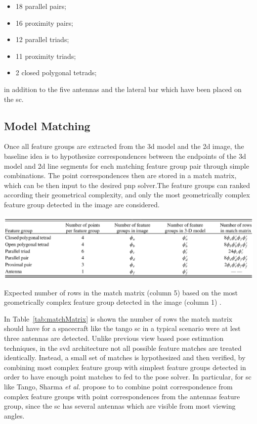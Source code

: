 \begin{itemize}
  \item 18 parallel pairs;
  \item 16 proximity pairs;
  \item 12 parallel triads;
  \item 11 proximity triads;
  \item 2 closed polygonal tetrads;
\end{itemize}

in addition to the five antennas and the lateral bar which have been placed on the \acrshort{sc}.

\subsection{Model Matching}
Once all feature groups are extracted from the \acrshort{3d} model and the \acrshort{2d} image, the baseline idea is to hypothesize correspondences between the endpoints of the \acrshort{3d} model and \acrshort{2d} line segments for each matching feature group pair through simple combinations. The point correspondences then are stored in a match matrix, which can be then input to the desired \acrshort{pnp} solver.The feature groups can ranked according their geometrical complexity, and only the most geometrically complex feature group detected in the image are considered.

\begin{table}[htbp]
  \centering
  \includegraphics[width=1.0\textwidth]{gfx/matchMatrix.eps}
  \caption{Expected number of rows in the match matrix (column 5) based on the most geometrically complex feature
    group detected in the image (column 1) \cite{Sharma2018}.}
  \label{tab:matchMatrix}
\end{table}

In Table~\ref{tab:matchMatrix} is shown the number of rows the match matrix should have for a spacecraft like the tango \acrshort{sc} in a typical scenario were at lest three antennas are detected.
Unlike previous view based pose estimation techniques, in the \acrshort{svd} architecture not all possible feature matches are treated identically. Instead, a small set of matches is hypothesized and then verified, by combining most complex feature group with simplest feature groups detected in order to have enough point matches to fed to the pose solver. In particular, for \acrshort{sc} like Tango, Sharma \textit{et al.} propose to to combine point correspondence from complex feature groups with point correspondences from the antennas feature group, since the \acrshort{sc} has several antennas which are visible from most viewing angles.

